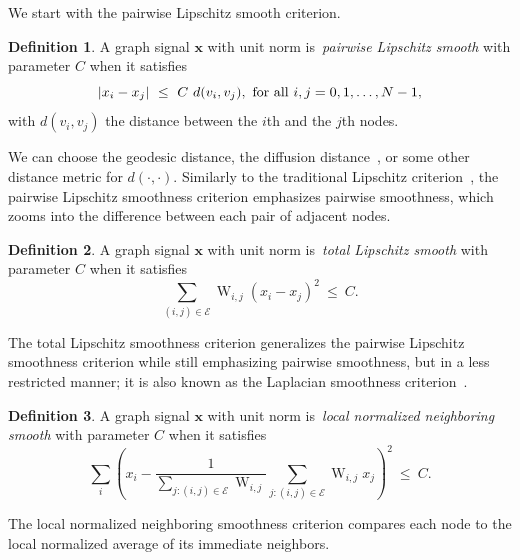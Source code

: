 \documentclass[journal,twocolumn,10pt]{IEEEtran}
\theoremstyle{definition}
\newtheorem{defn}{Definition}
\def\x{\mathbf{x}}
\def\E{\mathcal{E}}
\DeclareMathOperator{\W}{W}
\begin{document}
We start with the pairwise Lipschitz smooth criterion.
\begin{defn}
\label{df:pairwise_Lip}
A graph signal $\x$ with unit norm is~\emph{pairwise Lipschitz smooth} with parameter $C$ when it satisfies
\begin{equation*}
	| x_i - x_j |   \ \leq \  C \ d(v_i, v_j),~{\rm for~all~} i,j = 0, 1, \ldots, N-1,
\end{equation*}
with $d(v_i, v_j)$ the distance between the $i$th and the $j$th nodes.
\end{defn}
\noindent  We can choose the geodesic distance, the diffusion
distance~\cite{CoifmanL:06}, or some other distance metric for
$d(\cdot, \cdot)$.  Similarly to the traditional Lipschitz
criterion~\cite{Mallat:09}, the pairwise Lipschitz smoothness criterion
emphasizes pairwise smoothness, which zooms into the difference
between each pair of adjacent nodes.


\begin{defn}
\label{df:global_Lip}
A graph signal $\x$ with unit norm is~\emph{total Lipschitz smooth} with parameter $C$ when it satisfies
\begin{equation*}
	\sum_{(i,j) \in \E} \W_{i,j} ( x_i - x_j )^2   \ \leq \  C.
\end{equation*}
\end{defn}
\noindent The total Lipschitz smoothness criterion generalizes the pairwise Lipschitz smoothness criterion while still emphasizing pairwise smoothness, but in a less restricted manner; it is also known as the Laplacian smoothness criterion~\cite{BelkinN:03}.

\begin{defn}
\label{df:local_neighboring_smooth}
A graph signal $\x$ with unit norm  is~\emph{local normalized neighboring smooth  } with parameter $C$ when it satisfies
\begin{equation*}
	  \sum_i \left(  x_i -  \frac{1}{\sum_{j: (i,j) \in \E} \W_{i,j} }  \sum_{j: (i,j) \in \E} \W_{i,j} x_j  \right)^2  \ \leq \  C.
\end{equation*}
\end{defn}
\noindent The local normalized neighboring smoothness criterion compares each node to the local normalized average of its immediate neighbors.
\end{document}
